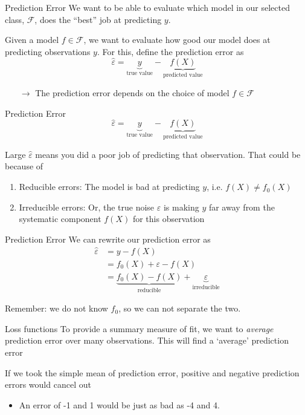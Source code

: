 \documentclass[aspectratio=169,t,11pt,table]{beamer}
\begin{document}
\begin{frame}{Prediction Error}
  We want to be able to evaluate which model in our selected class, $\mathcal{F}$, does the ``best'' job at predicting $y$. 
  
  \bigskip
  Given a model $f \in \mathcal{F}$, we want to evaluate how good our model does at predicting observations $y$. For this, define the \alert{prediction error} as 
  $$
    \hat{\varepsilon} = \underbrace{y}_{\text{true value}} - \underbrace{f(X)}_{\text{predicted value}}
  $$

  \begin{itemize}
    \item[$\rightarrow$] The prediction error depends on the choice of model $f \in \mathcal{F}$
  \end{itemize}
\end{frame}

\begin{frame}{Prediction Error}
  $$
    \hat{\varepsilon} = \underbrace{y}_{\text{true value}} - \underbrace{f(X)}_{\text{predicted value}}
  $$

  \bigskip
  Large $\hat{\varepsilon}$ means you did a poor job of predicting that observation. That could be because of
  \begin{enumerate}
    \item \alert{Reducible errors}: The model is bad at predicting $y$, i.e. $f(X) \neq f_0(X)$
    
    \item \alert{Irreducible errors}: Or, the true noise $\varepsilon$ is making $y$ far away from the systematic component $f(X)$ for this observation
  \end{enumerate}
\end{frame}

\begin{frame}{Prediction Error}
  We can rewrite our prediction error as
  \begin{align*}
    \hat{\varepsilon} &= y - f(X) \\
    &= f_0(X) + \varepsilon - f(X) \\
    &= \underbrace{f_0(X) - f(X)}_{\text{reducible}} + \underbrace{\varepsilon}_{\text{irreducible}}
  \end{align*}

  \bigskip
  {\color{orange} Remember:} we do not know $f_0$, so we can not separate the two.
\end{frame}

\begin{frame}{Loss functions}
  To provide a summary measure of fit, we want to \emph{average} prediction error over many observations. This will find a `average' prediction error

  \bigskip
  If we took the simple mean of prediction error, positive and negative prediction errors would cancel out
  \begin{itemize}
    \item An error of -1 and 1 would be just as bad as -4 and 4.
  \end{itemize}
\end{frame}
\end{document}
